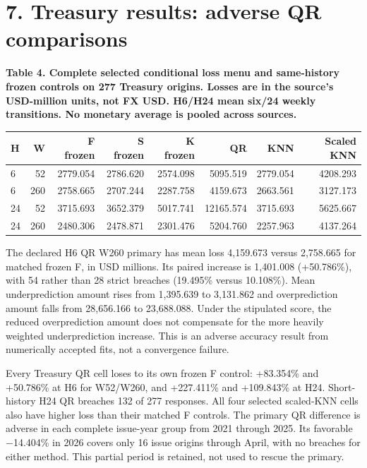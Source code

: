 \documentclass[10pt,a4paper]{article}
\begin{document}
\section*{7. Treasury results: adverse QR comparisons}
\begin{center}
\begin{minipage}{\linewidth}
\small\textbf{Table 4. Complete selected conditional loss menu and same-history frozen controls on 277 Treasury origins. Losses are in the source's USD-million units, not FX USD. H6/H24 mean six/24 weekly transitions. No monetary average is pooled across sources.}\par\medskip
\centering\fontsize{8}{10}\selectfont
\begin{tabular}{lrrrrrrr}
\toprule
H & W & F frozen & S frozen & K frozen & QR & KNN & Scaled KNN \\
\midrule
6 & 52 & 2779.054 & 2786.620 & 2574.098 & 5095.519 & 2779.054 & 4208.293 \\
6 & 260 & 2758.665 & 2707.244 & 2287.758 & 4159.673 & 2663.561 & 3127.173 \\
24 & 52 & 3715.693 & 3652.379 & 5017.741 & 12165.574 & 3715.693 & 5625.667 \\
24 & 260 & 2480.306 & 2478.871 & 2301.476 & 5204.760 & 2257.963 & 4137.264 \\
\bottomrule
\end{tabular}
\end{minipage}
\end{center}
The declared H6 QR W260 primary has mean loss 4,159.673 versus 2,758.665 for matched frozen F, in USD millions. Its paired increase is 1,401.008 (+50.786\%), with 54 rather than 28 strict breaches (19.495\% versus 10.108\%). Mean underprediction amount rises from 1,395.639 to 3,131.862 and overprediction amount falls from 28,656.166 to 23,688.088. Under the stipulated score, the reduced overprediction amount does not compensate for the more heavily weighted underprediction increase. This is an adverse accuracy result from numerically accepted fits, not a convergence failure.

Every Treasury QR cell loses to its own frozen F control: +83.354\% and +50.786\% at H6 for W52/W260, and +227.411\% and +109.843\% at H24. Short-history H24 QR breaches 132 of 277 responses. All four selected scaled-KNN cells also have higher loss than their matched F controls. The primary QR difference is adverse in each complete issue-year group from 2021 through 2025. Its favorable \(-\)14.404\% in 2026 covers only 16 issue origins through April, with no breaches for either method. This partial period is retained, not used to rescue the primary.
\end{document}
